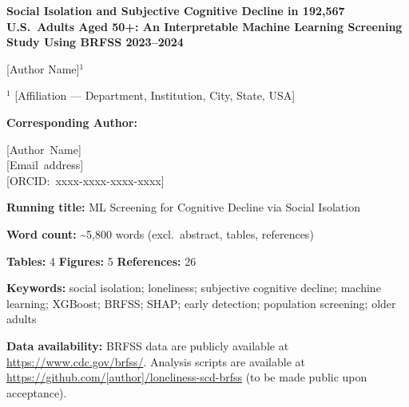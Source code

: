 \documentclass[12pt,a4paper]{article}
\begin{document}
\begin{titlepage}
  \centering
  \vspace*{1cm}
  {\LARGE\bfseries Social Isolation and Subjective Cognitive Decline in
  192,567 U.S.\ Adults Aged 50+: An Interpretable Machine Learning
  Screening Study Using BRFSS 2023--2024\par}

  \vspace{1.5cm}

  {\large [Author Name]$^{1}$\par}

  \vspace{0.8cm}

  {\normalsize
  $^{1}$ [Affiliation — Department, Institution, City, State, USA]\par}

  \vspace{1.2cm}

  \textbf{Corresponding Author:}\par
  \mbox{[Author Name]}\\
  \mbox{[Email address]}\\
  \mbox{[ORCID: xxxx-xxxx-xxxx-xxxx]}

  \vspace{1.2cm}

  \textbf{Running title:} ML Screening for Cognitive Decline via Social Isolation

  \vspace{0.8cm}

  \textbf{Word count:} \textasciitilde5,800 words (excl.\ abstract, tables, references)

  \vspace{0.8cm}

  \textbf{Tables:} 4 \quad \textbf{Figures:} 5 \quad \textbf{References:} 26

  \vspace{0.8cm}

  \textbf{Keywords:} social isolation; loneliness; subjective cognitive decline;
  machine learning; XGBoost; BRFSS; SHAP; early detection; population screening;
  older adults

  \vspace{0.8cm}

  \textbf{Data availability:} BRFSS data are publicly available at
  \url{https://www.cdc.gov/brfss/}. Analysis scripts are available at
  \url{https://github.com/[author]/loneliness-scd-brfss} (to be made public upon acceptance).


\end{titlepage}
\end{document}
